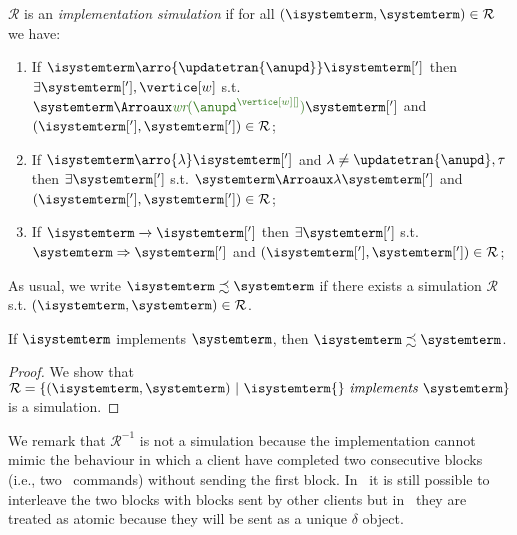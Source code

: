  

\begin{definition}[Simulation] $\mathcal{R}$ is an {\em implementation simulation} if for all 
$(\isystemterm,\systemterm)\in\mathcal{R}$ we have:
\begin{enumerate}
   \item If $\isystemterm\arro{\updatetran{\anupd}}\isystemterm[']$ then  $\exists\systemterm['],\vertice[w]$ s.t.  $\systemterm\Arroi{\updatetranaux{\anupd^{\vertice[w][]}}}\systemterm[']$ and $(\isystemterm['],\systemterm['])\in\mathcal{R}$;
   \item If $\isystemterm\arro{\lambda}\isystemterm[']$ and $\lambda\neq \updatetran{\anupd},\tau$ then  $\exists\systemterm[']$  s.t.  $\systemterm\Arroi{\lambda}\systemterm[']$ and $(\isystemterm['],\systemterm['])\in\mathcal{R}$;
   \item If $\isystemterm\tr{}\isystemterm[']$  then  $\exists\systemterm[']$  s.t.  $\systemterm\Arro\systemterm[']$ and $(\isystemterm['],\systemterm['])\in\mathcal{R}$;
\end{enumerate} 
\end{definition}

As usual, we write $\isystemterm\precsim\systemterm$ if there exists a {simulation} $\mathcal{R}$ s.t.  
$(\isystemterm,\systemterm)\in\mathcal{R}$.

%
%

\begin{theorem}
\label{thm:simulation}
 If  $\isystemterm$ implements $\systemterm$, then $\isystemterm\precsim\systemterm$. 
\end{theorem}

\begin{proof}
We show that $\mathcal{R} = \{ (\isystemterm, \systemterm) \ |\ \implements{\isystemterm{}}{\systemterm} \}$ is a simulation.
\end{proof}

We remark that  $\mathcal{R}^{-1}$ is not a simulation because the implementation cannot mimic  the 
behaviour in which a client   have completed two 
consecutive blocks (i.e., two \pushcmd\ commands) without sending the first block. In \gsp\, it is still possible to interleave the two 
blocks with blocks sent by other clients but in \igsp\  they are treated as atomic
because they  will be sent as a unique $\delta$ object. 